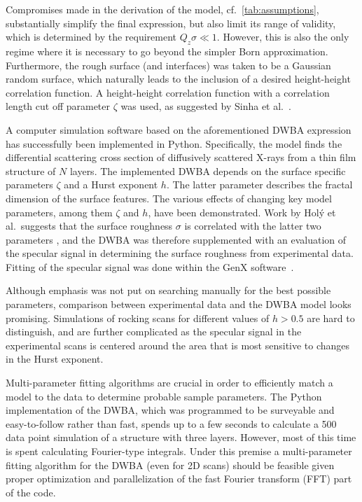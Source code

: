 \documentclass[10pt,twoside, b5paper,pdftex]{report}
\begin{document}
Compromises made in the derivation of the model, cf.~\cref{tab:assumptions}, substantially simplify the final expression, but also limit its range of validity, which is determined by the requirement $Q_z\sigma \ll 1$. However, this is also the only regime where it is necessary to go beyond the simpler Born approximation.
Furthermore, the rough surface (and interfaces) was taken to be a Gaussian random surface, which naturally leads to the inclusion of a desired height-height correlation function. A height-height correlation function with a correlation length cut off parameter $\zeta$ was used, as suggested by Sinha et al.~\cite{SINHA}. %

A computer simulation software based on the aforementioned DWBA expression has successfully been implemented in Python. Specifically, the model finds the  differential scattering cross section of diffusively scattered X-rays from a thin film structure of $N$ layers. The implemented DWBA  depends on the surface specific parameters $\zeta$ and a Hurst exponent $h$. The latter parameter describes the fractal dimension of the surface features. The various effects of changing key model parameters, among them $\zeta$ and $h$, have been demonstrated. Work by Holý et al.~suggests that the surface roughness $\sigma$ is correlated with the latter two parameters \cite{HOLY}, and the DWBA was therefore supplemented with an evaluation of the specular signal in determining the surface roughness from experimental data. Fitting of the specular signal was done within the GenX software~\cite{BJORCK}.





Although emphasis was not put on searching manually for the best possible parameters, comparison between experimental data and the DWBA model looks promising. Simulations of rocking scans for different values of $h > 0.5$ are hard to distinguish, and are further complicated  as the specular signal in the experimental scans is centered around the area that is most sensitive to changes in the Hurst exponent.

Multi-parameter fitting algorithms are crucial in order to efficiently match a model to the data to determine probable sample parameters. The Python implementation of the DWBA, which was programmed to be surveyable and easy-to-follow rather than fast, spends up to a few seconds to calculate a 500 data point simulation of a structure with three layers. However, most of this time is spent calculating Fourier-type integrals. Under this premise a multi-parameter fitting algorithm for the DWBA (even for 2D scans) should be feasible given proper optimization and parallelization of the fast Fourier transform (FFT) part of the code. 
\end{document}
